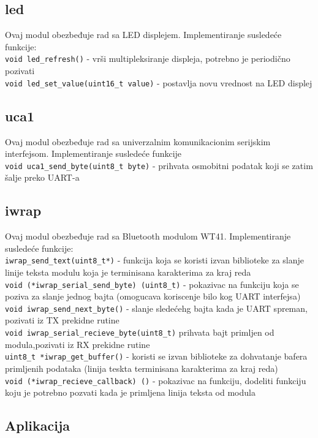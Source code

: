 \subsection{led}
Ovaj modul obezbeđuje rad sa LED displejem. Implementiranje susledeće funkcije:\\
\verb+void led_refresh()+ - vrši multipleksiranje displeja, potrebno je periodično pozivati\\
\verb+void led_set_value(uint16_t value)+ - postavlja novu vrednost na LED displej\\

\subsection{uca1}
Ovaj modul obezbeđuje rad sa univerzalnim komunikacionim serijskim interfejsom. Implementiranje susledeće funkcije\\
\verb+void uca1_send_byte(uint8_t byte)+ - prihvata osmobitni podatak koji se zatim šalje preko UART-a\\

\subsection{iwrap}
Ovaj modul obezbeđuje rad sa Bluetooth modulom WT41. Implementiranje susledeće funkcije:\\
\verb+iwrap_send_text(uint8_t*)+ - funkcija koja se koristi izvan biblioteke za slanje linije teksta modulu koja je terminisana karakterima za kraj reda\\
\verb+void (*iwrap_serial_send_byte) (uint8_t)+ - pokazivac na funkciju koja se poziva za slanje jednog bajta (omogucava koriscenje bilo kog UART interfejsa)\\
\verb+void iwrap_send_next_byte()+ - slanje sledećehg bajta kada je UART spreman, pozivati iz TX prekidne rutine\\
\verb+void iwrap_serial_recieve_byte(uint8_t)+ prihvata bajt primljen od modula,pozivati iz RX prekidne rutine\\
\verb+uint8_t *iwrap_get_buffer()+ - koristi se izvan biblioteke za dohvatanje bafera primljenih podataka (linija teskta terminisana karakterima za kraj reda)\\
\verb+void (*iwrap_recieve_callback) ()+ - pokazivac na funkciju, dodeliti funkciju koju je potrebno pozvati kada je primljena linija teksta od modula\\

\subsection{Aplikacija}


